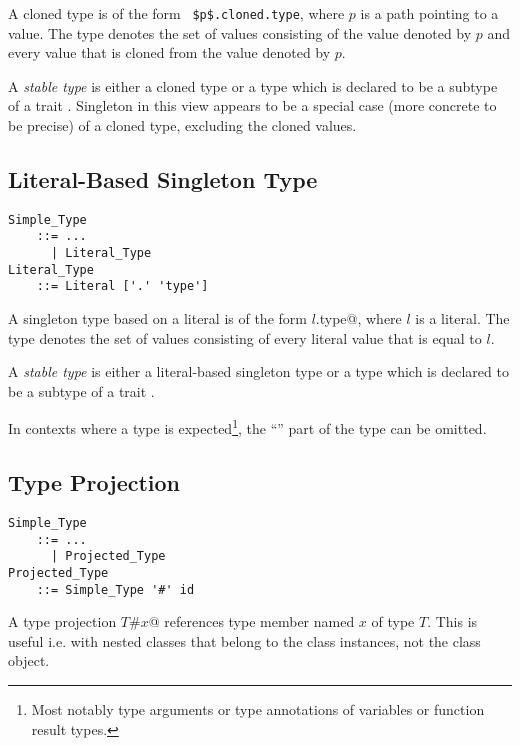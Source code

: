 A cloned type is of the form ~\lstinline!$p$.cloned.type!, where $p$ is a path pointing to a value. The type denotes the set of values consisting of the value denoted by $p$ and every value that is cloned from the value denoted by $p$. 

A {\em stable type} is either a cloned type or a type which is declared to be a subtype of a trait . Singleton in this view appears to be a special case (more concrete to be precise) of a cloned type, excluding the cloned values. 





\subsection{Literal-Based Singleton Type}
\label{sec:literal-based-singleton-type}

\grammar\begin{lstlisting}
Simple_Type 
    ::= ...
      | Literal_Type
Literal_Type
    ::= Literal ['.' 'type']
\end{lstlisting}

A singleton type based on a literal is of the form \lstinline@$l$.type@, where $l$ is a literal. The type denotes the set of values consisting of every literal value that is equal to $l$. 

A {\em stable type} is either a literal-based singleton type or a type which is declared to be a subtype of a trait . 

In contexts where a type is expected\footnote{Most notably type arguments or type annotations of variables or function result types.}, the ``'' part of the type can be omitted. 





\subsection{Type Projection}
\label{sec:type-projection}

\grammar\begin{lstlisting}
Simple_Type 
    ::= ...
      | Projected_Type
Projected_Type
    ::= Simple_Type '#' id
\end{lstlisting}

A type projection \lstinline@$T$#$x$@ references type member named $x$ of type $T$. This is useful i.e. with nested classes that belong to the class instances, not the class object. 

